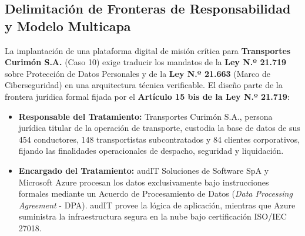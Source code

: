 \subsection{Delimitación de Fronteras de Responsabilidad y Modelo Multicapa}\label{delimitaciuxf3n-de-fronteras-de-responsabilidad-y-modelo-multicapa}

La implantación de una plataforma digital de misión crítica para \textbf{Transportes Curimón S.A.} (Caso 10) exige traducir los mandatos de la \textbf{Ley N.º 21.719} sobre Protección de Datos Personales y de la \textbf{Ley N.º 21.663} (Marco de Ciberseguridad) en una arquitectura técnica verificable. El diseño parte de la frontera jurídica formal fijada por el \textbf{Artículo 15 bis de la Ley N.º 21.719}:

\begin{itemize}
\tightlist
\item
  \textbf{Responsable del Tratamiento:} Transportes Curimón S.A., persona jurídica titular de la operación de transporte, custodia la base de datos de sus 454 conductores, 148 transportistas subcontratados y 84 clientes corporativos, fijando las finalidades operacionales de despacho, seguridad y liquidación.
\item
  \textbf{Encargado del Tratamiento:} audIT Soluciones de Software SpA y Microsoft Azure procesan los datos exclusivamente bajo instrucciones formales mediante un Acuerdo de Procesamiento de Datos (\emph{Data Processing Agreement} - DPA). audIT provee la lógica de aplicación, mientras que Azure suministra la infraestructura segura en la nube bajo certificación ISO/IEC 27018.
\end{itemize}

